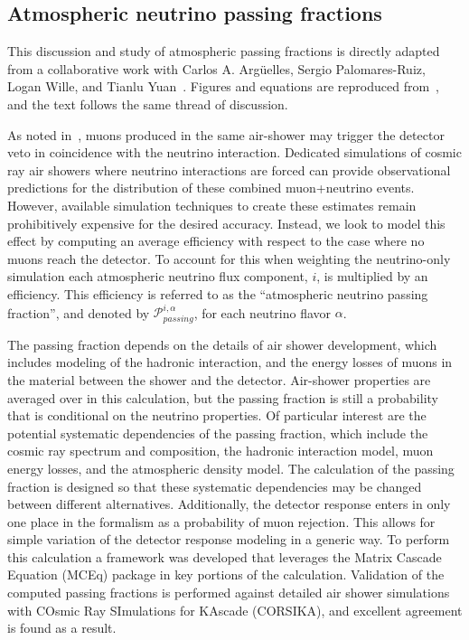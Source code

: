 \subsection{Atmospheric neutrino passing fractions}
\label{sec:passingfractions}
This discussion and study of atmospheric passing fractions is directly adapted from a collaborative work with Carlos A. Argüelles, Sergio Palomares-Ruiz, Logan Wille, and Tianlu Yuan~\cite{Arguelles:2018awr}.
Figures and equations are reproduced from~\cite{Arguelles:2018awr}, and the text follows the same thread of discussion.

As noted in~\cite{Schonert:2008is}, muons produced in the same air-shower may trigger the detector veto in coincidence with the neutrino interaction.
Dedicated simulations of cosmic ray air showers where neutrino interactions are forced can provide observational predictions for the distribution of these combined muon+neutrino events.
However, available simulation techniques to create these estimates remain prohibitively expensive for the desired accuracy.
Instead, we look to model this effect by computing an average efficiency with respect to the case where no muons reach the detector.
To account for this when weighting the neutrino-only simulation each atmospheric neutrino flux component, $i$, is multiplied by an efficiency.
This efficiency is referred to as the ``atmospheric neutrino passing fraction'', and denoted by $\mathcal{P}^{i,\alpha}_{passing}$, for each neutrino flavor $\alpha$.

The passing fraction depends on the details of air shower development, which includes modeling of the hadronic interaction, and the energy losses of muons in the material between the shower and the detector. 
Air-shower properties are averaged over in this calculation, but the passing fraction is still a probability that is conditional on the neutrino properties.
Of particular interest are the potential systematic dependencies of the passing fraction, which include the cosmic ray spectrum and composition, the hadronic interaction model, muon energy losses, and the atmospheric density model.
The calculation of the passing fraction is designed so that these systematic dependencies may be changed between different alternatives.
Additionally, the detector response enters in only one place in the formalism as a probability of muon rejection.
This allows for simple variation of the detector response modeling in a generic way.
To perform this calculation a framework was developed that leverages the Matrix Cascade Equation (MCEq) package in key portions of the calculation.
Validation of the computed passing fractions is performed against detailed air shower simulations with COsmic Ray SImulations for KAscade (CORSIKA), and excellent agreement is found as a result.

